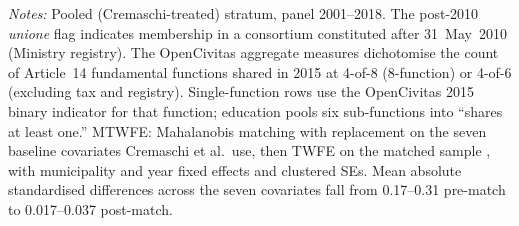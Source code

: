 \begin{table}[!htbp]
\begin{threeparttable}
\begin{tablenotes}[flushleft]
      \item \textit{Notes:} Pooled (Cremaschi-treated) stratum, panel 2001--2018. The post-2010 \textit{unione} flag indicates membership in a consortium constituted after 31~May~2010 (Ministry registry). The OpenCivitas aggregate measures dichotomise the count of Article~14 fundamental functions shared in 2015 at 4-of-8 (8-function) or 4-of-6 (excluding tax and registry). Single-function rows use the OpenCivitas 2015 binary indicator for that function; education pools six sub-functions into ``shares at least one.'' MTWFE: Mahalanobis matching with replacement on the seven baseline covariates Cremaschi et al.\ use, then TWFE on the matched sample \citep{ho2007}, with municipality and year fixed effects and clustered SEs. Mean absolute standardised differences across the seven covariates fall from 0.17--0.31 pre-match to 0.017--0.037 post-match.
    \end{tablenotes}
  \end{threeparttable}
\end{table}
